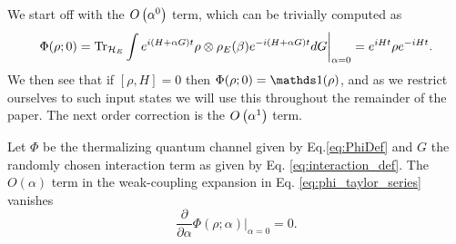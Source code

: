We start off with the $O\left( \alpha^0 \right)$ term, which can be trivially computed as
\begin{align}
\Phi(\rho; 0) = \operatorname{Tr}_{\mathcal{H}_E}\int e^{i(H + \alpha G) t} \rho \otimes \rho_E(\beta) e^{-i (H + \alpha G) t} dG \bigg|_{\alpha = 0} = e^{i H t} \rho e^{-i H t}.
\end{align}
We then see that if $[ \rho, H] = 0$ then $\Phi(\rho; 0) = \identity(\rho)$, and as we restrict ourselves to such input states we will use this throughout the remainder of the paper. The next order correction is the $O\left( \alpha^1 \right)$ term. 
\begin{theorem} \label{lem:first_order_phi}
Let $\Phi$ be the thermalizing quantum channel given by Eq.\eqref{eq:PhiDef} and $G$ the randomly chosen interaction term as given by Eq. \eqref{eq:interaction_def}. The $O(\alpha)$ term in the weak-coupling expansion in Eq. \eqref{eq:phi_taylor_series} vanishes
   \begin{equation}
        \frac{\partial}{\partial \alpha} \Phi(\rho; \alpha) \big|_{\alpha = 0} = 0.
   \end{equation}
\end{theorem}
